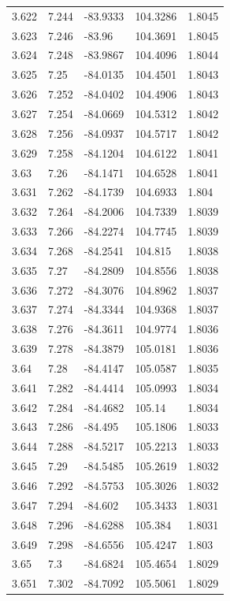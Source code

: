 \begin{tabular}{lllll}
3.622 & 7.244 & -83.9333 & 104.3286 & 1.8045 \\
3.623 & 7.246 & -83.96 & 104.3691 & 1.8045 \\
3.624 & 7.248 & -83.9867 & 104.4096 & 1.8044 \\
3.625 & 7.25 & -84.0135 & 104.4501 & 1.8043 \\
3.626 & 7.252 & -84.0402 & 104.4906 & 1.8043 \\
3.627 & 7.254 & -84.0669 & 104.5312 & 1.8042 \\
3.628 & 7.256 & -84.0937 & 104.5717 & 1.8042 \\
3.629 & 7.258 & -84.1204 & 104.6122 & 1.8041 \\
3.63 & 7.26 & -84.1471 & 104.6528 & 1.8041 \\
3.631 & 7.262 & -84.1739 & 104.6933 & 1.804 \\
3.632 & 7.264 & -84.2006 & 104.7339 & 1.8039 \\
3.633 & 7.266 & -84.2274 & 104.7745 & 1.8039 \\
3.634 & 7.268 & -84.2541 & 104.815 & 1.8038 \\
3.635 & 7.27 & -84.2809 & 104.8556 & 1.8038 \\
3.636 & 7.272 & -84.3076 & 104.8962 & 1.8037 \\
3.637 & 7.274 & -84.3344 & 104.9368 & 1.8037 \\
3.638 & 7.276 & -84.3611 & 104.9774 & 1.8036 \\
3.639 & 7.278 & -84.3879 & 105.0181 & 1.8036 \\
3.64 & 7.28 & -84.4147 & 105.0587 & 1.8035 \\
3.641 & 7.282 & -84.4414 & 105.0993 & 1.8034 \\
3.642 & 7.284 & -84.4682 & 105.14 & 1.8034 \\
3.643 & 7.286 & -84.495 & 105.1806 & 1.8033 \\
3.644 & 7.288 & -84.5217 & 105.2213 & 1.8033 \\
3.645 & 7.29 & -84.5485 & 105.2619 & 1.8032 \\
3.646 & 7.292 & -84.5753 & 105.3026 & 1.8032 \\
3.647 & 7.294 & -84.602 & 105.3433 & 1.8031 \\
3.648 & 7.296 & -84.6288 & 105.384 & 1.8031 \\
3.649 & 7.298 & -84.6556 & 105.4247 & 1.803 \\
3.65 & 7.3 & -84.6824 & 105.4654 & 1.8029 \\
3.651 & 7.302 & -84.7092 & 105.5061 & 1.8029 \\

\end{tabular}
